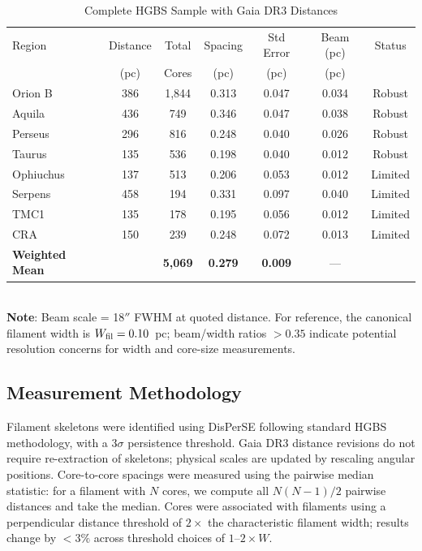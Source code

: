 \documentclass[twoside,twocolumn]{mnras}
\begin{document}
\begin{table}
\caption{Complete HGBS Sample with Gaia DR3 Distances}
\label{tab:sample}
\begin{tabular}{lcccccc}
\toprule
Region & Distance & Total & Spacing & Std Error & Beam (pc) & Status \\
       & (pc)   & Cores & (pc)   & (pc)      & (pc) & \\
\midrule
Orion B  & 386 & 1,844 & 0.313 & 0.047 & 0.034 & Robust \\
Aquila   & 436 & 749   & 0.346 & 0.047 & 0.038 & Robust \\
Perseus  & 296 & 816   & 0.248 & 0.040 & 0.026 & Robust \\
Taurus   & 135 & 536   & 0.198 & 0.040 & 0.012 & Robust \\
Ophiuchus& 137 & 513   & 0.206 & 0.053 & 0.012 & Limited \\
Serpens  & 458 & 194   & 0.331 & 0.097 & 0.040 & Limited \\
TMC1     & 135 & 178   & 0.195 & 0.056 & 0.012 & Limited \\
CRA      & 150 & 239   & 0.248 & 0.072 & 0.013 & Limited \\
\midrule
\textbf{Weighted Mean} &  & \textbf{5,069} & \textbf{0.279} & \textbf{0.009} & --- &  \\
\bottomrule
\end{tabular}
\\ \footnotesize \textbf{Note}: Beam scale = 18$''$ FWHM at quoted distance. For reference, the canonical filament width is $W_{\rm fil} = 0.10$~pc; beam/width ratios $> 0.35$ indicate potential resolution concerns for width and core-size measurements.
\end{table}

\subsection{Measurement Methodology}

Filament skeletons were identified using DisPerSE \citep{Sousbie2011} following standard
HGBS methodology, with a $3\sigma$ persistence threshold. Gaia DR3 distance revisions
do not require re-extraction of skeletons; physical scales are updated by rescaling
angular positions. Core-to-core spacings were measured using the pairwise median
statistic: for a filament with $N$ cores, we compute all $N(N-1)/2$ pairwise distances
and take the median. Cores were associated with filaments using a perpendicular
distance threshold of $2\times$ the characteristic filament width; results change
by $<3\%$ across threshold choices of $1$--$2\times W$.
\end{document}
